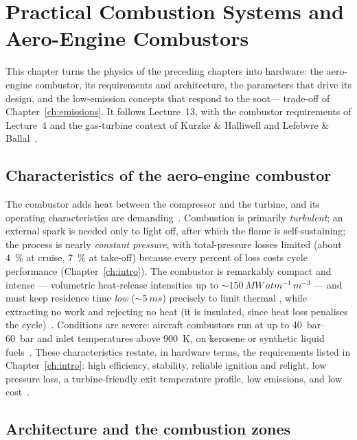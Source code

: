 \chapter{Practical Combustion Systems and Aero-Engine Combustors}\label{ch:combustors}

This chapter turns the physics of the preceding chapters into hardware: the aero-engine combustor, its requirements and architecture, the parameters that drive its design, and the low-emission concepts that respond to the soot---- trade-off of Chapter~\ref{ch:emissions}. It follows Lecture~13, with the combustor requirements of Lecture~4 and the gas-turbine context of Kurzke \& Halliwell and Lefebvre \& Ballal~\cite{lecture13,lecture4,Kurzke2018,lefebvre2010gas}.

\section{Characteristics of the aero-engine combustor}

The combustor adds heat between the compressor and the turbine, and its operating characteristics are demanding~\cite{lecture13}. Combustion is primarily \emph{turbulent}; an external spark is needed only to light off, after which the flame is self-sustaining; the process is nearly \emph{constant pressure}, with total-pressure losses limited (about \SI{4}{\percent} at cruise, \SI{7}{\percent} at take-off) because every percent of loss costs cycle performance (Chapter~\ref{ch:intro}). The combustor is remarkably compact and intense --- volumetric heat-release intensities up to $\sim\SI{150}{MW\,atm^{-1}\,m^{-3}}$ --- and must keep residence time \emph{low} ($\sim\SI{5}{ms}$) precisely to limit thermal , while extracting no work and rejecting no heat (it is insulated, since heat loss penalises the cycle)~\cite{lecture13}. Conditions are severe: aircraft combustors run at up to \SIrange{40}{60}{bar} and inlet temperatures above \SI{900}{K}, on kerosene or synthetic liquid fuels~\cite{lecture13}. These characteristics restate, in hardware terms, the requirements listed in Chapter~\ref{ch:intro}: high efficiency, stability, reliable ignition and relight, low pressure loss, a turbine-friendly exit temperature profile, low emissions, and low cost~\cite{lecture4,lecture13}.

\section{Architecture and the combustion zones}

